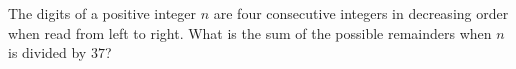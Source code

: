 The digits of a positive integer $n$ are four consecutive integers in decreasing order when read from left to right. What is the sum of the possible remainders when $n$ is divided by $37$?